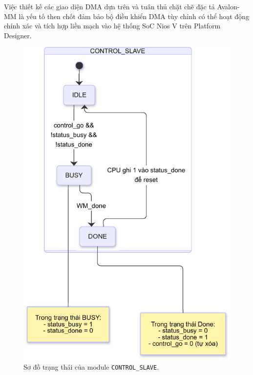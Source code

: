 Việc thiết kế các giao diện DMA dựa trên và tuân thủ chặt chẽ đặc tả Avalon-MM là yếu tố then chốt đảm bảo bộ điều khiển DMA tùy chỉnh có thể hoạt động chính xác và tích hợp liền mạch vào hệ thống SoC Nios V trên Platform Designer.


\begin{figure}[htbp]
    \centering
    \includegraphics[width=0.5\linewidth]{Images/02_11_StateDiagram_ControlSlave}
    \caption{Sơ đồ trạng thái của module \texttt{CONTROL\_SLAVE}.}
    \label{fig:02_11_StateDiagram_ControlSlave}
\end{figure}

